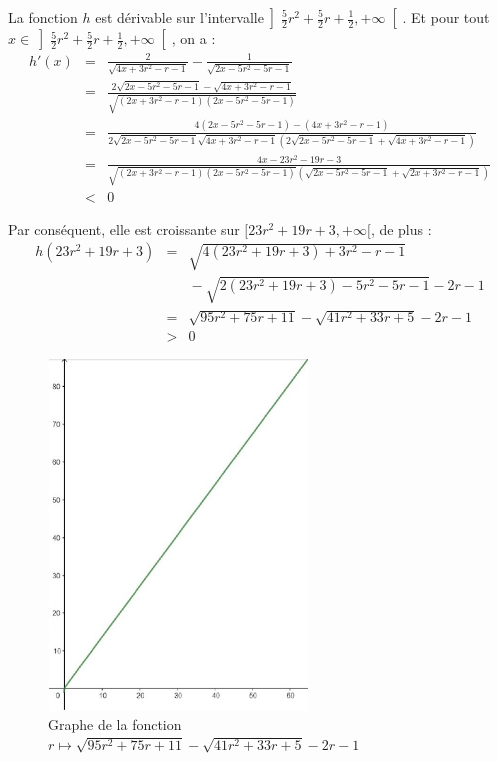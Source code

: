 La fonction $h$ est d{\'e}rivable sur l'intervalle$\left] \frac{5}{2} r^2 +
\frac{5}{2} r + \frac{1}{2}, + \infty \right[$. Et pour tout $x \in \left]
\frac{5}{2} r^2 + \frac{5}{2} r + \frac{1}{2}, + \infty \right[$, on a :
\begin{eqnarray*}
  h' (x) & = & \frac{2}{\sqrt{4 x + 3 r^2 - r - 1}} - \frac{1}{\sqrt{2 x - 5
  r^2 - 5 r - 1}}\\
  & = & \frac{2 \sqrt{2 x - 5 r^2 - 5 r - 1} - \sqrt{4 x + 3 r^2 - r -
  1}}{\sqrt{(2 x + 3 r^2 - r - 1) (2 x - 5 r^2 - 5 r - 1) }}\\
  & = & \frac{4 (2 x - 5 r^2 - 5 r - 1) - (4 x + 3 r^2 - r - 1)}{2 \sqrt{2 x
  - 5 r^2 - 5 r - 1} \sqrt{4 x + 3 r^2 - r - 1} \left( 2 \sqrt{2 x - 5 r^2 - 5
  r - 1} + \sqrt{4 x + 3 r^2 - r - 1} \right)}\\
  & = & \frac{4 x - 23 r^2 - 19 r - 3}{\sqrt{(2 x + 3 r^2 - r - 1) (2 x - 5
  r^2 - 5 r - 1) } \left( \sqrt{2 x - 5 r^2 - 5 r - 1} + \sqrt{2 x + 3 r^2 - r
  - 1} \right)}\\
  & < & 0
\end{eqnarray*}


Par cons{\'e}quent, elle est croissante sur $[23 r^2 + 19 r + 3, + \infty [$,
de plus :
\begin{eqnarray*}
  h (23 r^2 + 19 r + 3) &=& \sqrt{4 (23 r^2 + 19 r + 3) + 3 r^2 - r - 1} \\
  && {} - \sqrt{2 (23 r^2 + 19 r + 3) - 5 r^2 - 5 r - 1} - 2 r - 1 \\
  &=& \sqrt{95 r^2 + 75 r + 11} - \sqrt{41 r^2 + 33 r + 5} - 2 r - 1 \\
  &>& 0
\end{eqnarray*}

\begin{figure}[h]
  \centering
  \includegraphics[width=6.906cm,height=9.3cm]{figures/Math_oraux-7.pdf}
  \caption{Graphe de la fonction $r \longmapsto \sqrt{95 r^2 + 75 r + 11} -
  \sqrt{41 r^2 + 33 r + 5} - 2 r - 1$}
\end{figure}


